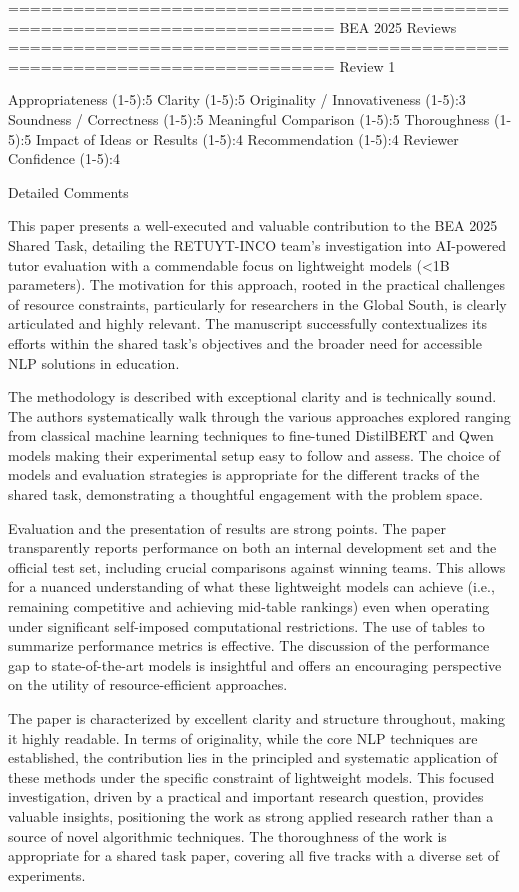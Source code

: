 ============================================================================ 
BEA 2025 Reviews
============================================================================
Review 1

Appropriateness (1-5):5
Clarity (1-5):5
Originality / Innovativeness (1-5):3
Soundness / Correctness (1-5):5
Meaningful Comparison (1-5):5
Thoroughness (1-5):5
Impact of Ideas or Results (1-5):4
Recommendation (1-5):4
Reviewer Confidence (1-5):4

Detailed Comments

This paper presents a well-executed and valuable contribution to the BEA 2025 Shared Task, detailing the RETUYT-INCO team's investigation into AI-powered tutor evaluation with a commendable focus on lightweight models (<1B parameters). The motivation for this approach, rooted in the practical challenges of resource constraints, particularly for researchers in the Global South, is clearly articulated and highly relevant. The manuscript successfully contextualizes its efforts within the shared task's objectives and the broader need for accessible NLP solutions in education.

The methodology is described with exceptional clarity and is technically sound. The authors systematically walk through the various approaches explored ranging from classical machine learning techniques to fine-tuned DistilBERT and Qwen models making their experimental setup easy to follow and assess. The choice of models and evaluation strategies is appropriate for the different tracks of the shared task, demonstrating a thoughtful engagement with the problem space.

Evaluation and the presentation of results are strong points. The paper transparently reports performance on both an internal development set and the official test set, including crucial comparisons against winning teams. This allows for a nuanced understanding of what these lightweight models can achieve (i.e., remaining competitive and achieving mid-table rankings) even when operating under significant self-imposed computational restrictions. The use of tables to summarize performance metrics is effective. The discussion of the performance gap to state-of-the-art models is insightful and offers an encouraging perspective on the utility of resource-efficient approaches.

The paper is characterized by excellent clarity and structure throughout, making it highly readable. In terms of originality, while the core NLP techniques are established, the contribution lies in the principled and systematic application of these methods under the specific constraint of lightweight models. This focused investigation, driven by a practical and important research question, provides valuable insights, positioning the work as strong applied research rather than a source of novel algorithmic techniques. The thoroughness of the work is appropriate for a shared task paper, covering all five tracks with a diverse set of experiments.

